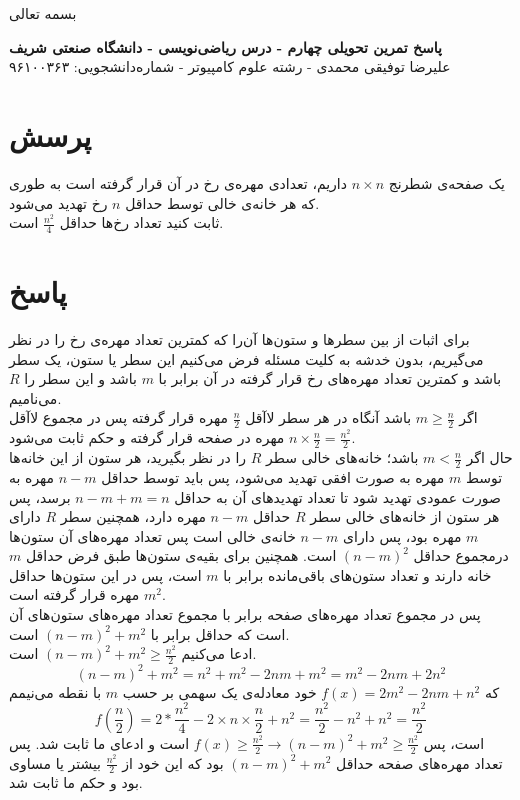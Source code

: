 \documentclass[12pt,a4paper]{article}
\begin{document}
\begin{center}
	بسمه تعالی
\end{center}
\begin{center}
	\textbf{پاسخ تمرین تحویلی چهارم - درس ریاضی‌نویسی - دانشگاه صنعتی شریف}
	\\
	علیرضا توفیقی محمدی - رشته علوم کامپیوتر - شماره‌دانشجویی: ۹۶۱۰۰۳۶۳
\end{center}
\section*{پرسش}
یک صفحه‌ی شطرنج $n \times n$ داریم، تعدادی مهره‌ی رخ در آن قرار گرفته است به طوری که هر خانه‌ی خالی توسط حداقل $n$ رخ تهدید می‌شود.
\\
ثابت کنید تعداد رخ‌ها حداقل 
$\frac{n^2}{4}$
است.
\section*{پاسخ}
برای اثبات از بین سطرها و ستون‌ها آن‌را که کمترین تعداد مهره‌ی رخ را در نظر می‌گیریم، بدون خدشه به کلیت مسئله فرض می‌کنیم این سطر یا ستون، یک سطر باشد و کمترین تعداد مهره‌های رخ قرار گرفته در آن برابر با $m$ باشد و این سطر را $R$ می‌نامیم.
\\
اگر 
$m \geq \frac{n}{2}$
باشد آنگاه در هر سطر لاآقل
$\frac{n}{2}$
مهره قرار گرفته پس در مجموع لاآقل 
$n \times \frac{n}{2} = \frac{n^2}{2}$
مهره در صفحه قرار گرفته و حکم ثابت می‌شود.
\\
حال اگر 
$m < \frac{n}{2}$
باشد؛ خانه‌های خالی سطر $R$ را در نظر بگیرید، هر ستون از این خانه‌ها توسط $m$ مهره به صورت افقی تهدید می‌شود، پس باید توسط حداقل $n-m$ مهره به صورت عمودی تهدید شود تا تعداد تهدید‌های آن به حداقل $n-m + m = n$ برسد، پس هر ستون از خانه‌های خالی سطر $R$ حداقل $n-m$ مهره دارد، همچنین سطر $R$ دارای $m$ مهره بود، پس دارای $n-m$ خانه‌ی خالی است پس تعداد مهره‌های آن ستون‌ها درمجموع حداقل $(n-m)^2$ است.
همچنین برای بقیه‌ی ستون‌ها طبق فرض حداقل $m$ خانه دارند و تعداد ستون‌های باقی‌مانده برابر با $m$ است، پس در این ستون‌ها حداقل $m^2$ مهره قرار گرفته است.
\\
پس در مجموع تعداد مهره‌های صفحه برابر با مجموع تعداد مهره‌های ستون‌های آن است که حداقل برابر با 
$(n-m)^2 + m^2$
است.
\\
ادعا می‌کنیم
$(n-m)^2 + m^2 \geq \frac{n^2}{2}$
است.
\[
(n-m)^2 + m^2 = n^2 + m^2 - 2nm + m^2 = m^2 - 2nm + 2n^2
\]
که 
$f(x) = 2m^2 - 2nm + n^2$
 خود معادله‌ی یک سهمی بر حسب $m$ با نقطه می‌نیمم 
\[
f(\frac{n}{2}) = 2*\frac{n^2}{4} - 2\times n \times \frac{n}{2} + n^2 = \frac{n^2}{2} - n^2 + n^2 = \frac{n^2}{2}
\]
 است، پس
 $f(x) \geq \frac{n^2}{2} \rightarrow (n-m)^2 + m^2 \geq \frac{n^2}{2}$
 است و ادعای ما ثابت شد.
پس تعداد مهره‌های صفحه حداقل $(n-m)^2 + m^2$ بود که این خود از 
$\frac{n^2}{2}$
بیشتر یا مساوی بود و حکم ما ثابت شد.
\end{document}

